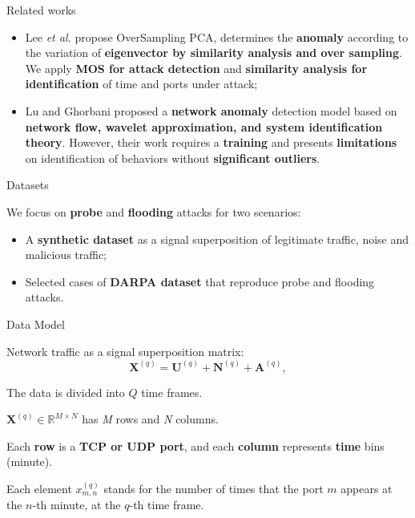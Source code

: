 \documentclass[newPxFont, numfooter, sectionpages]{beamer}
\begin{document}
\begin{frame}[c]{Related works}
	
	\begin{itemize}
		\item Lee \emph{et al.} \cite{Lee2013} propose OverSampling PCA, determines the \textbf{anomaly} according to the variation of \textbf{eigenvector by similarity analysis and over sampling}. We apply \textbf{MOS for attack detection} and \textbf{similarity analysis for identification} of time and ports under attack;
		\item Lu and Ghorbani \cite{Lu2009} proposed a \textbf{network anomaly} detection model based on \textbf{network flow, wavelet approximation, and system identification theory}. However, their work requires a \textbf{training} and presents \textbf{limitations} on identification of behaviors without \textbf{significant outliers}.
	\end{itemize}
	
\end{frame}
\begin{frame}{Datasets}
	
	We focus on \textbf{probe} and \textbf{flooding} attacks for two scenarios: 
	\begin{itemize}
		\item A \textbf{synthetic dataset} as a signal superposition of legitimate traffic, noise and malicious traffic;
		\item Selected cases of \textbf{DARPA dataset} that reproduce probe and flooding attacks.
	\end{itemize}

\end{frame}
\begin{frame}{Data Model}
	
	Network traffic as a signal superposition matrix:
	\begin{equation}\label{eq:eq01}
		\boldsymbol{X}^{(q)} = \boldsymbol{U}^{(q)} + \boldsymbol{N}^{(q)} + \boldsymbol{A}^{(q)},
	\end{equation}

	The data is divided into $Q$ time frames.

	$\boldsymbol{X}^{(q)} \in \mathbb{R}^{M \times N}$ has \emph{M} rows and \emph{N} columns.

	Each \textbf{row} is a \textbf{TCP or UDP port}, and each \textbf{column} represents \textbf{time} bins (minute).

	Each element $x_{m,n}^{(q)}$ stands for the number of times that the port $m$ appears at the $n$-th minute, at the $q$-th time frame.

\end{frame}
\end{document}
